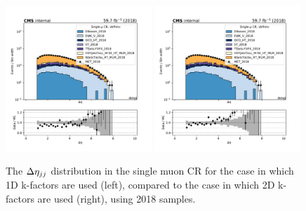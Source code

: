 \begin{figure}
    \begin{center}
        \includegraphics[width=0.49\textwidth]{fig/datamc/cr_1m_vbf/cr_1m_vbf_detajj_losf_2018.pdf}
        \includegraphics[width=0.49\textwidth]{fig/datamc_2dkfac/cr_1m_vbf/cr_1m_vbf_detajj_losf_2018.pdf} 
        \caption{The $\Delta \eta_{jj}$ distribution in the single muon CR for the case in which 1D k-factors are used (left), 
        compared to the case in which 2D k-factors are used (right), using 2018 samples.}
        \label{fig:detajj_2018}
    \end{center}
\end{figure}

